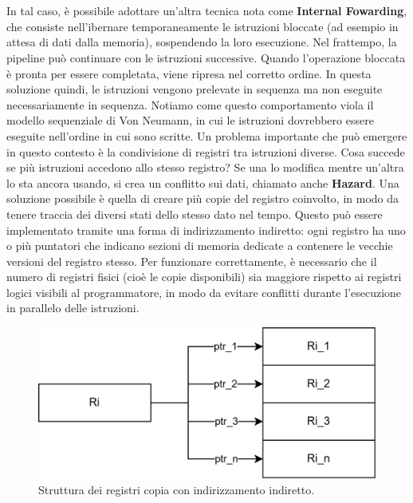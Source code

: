 \\
\\
In tal caso, è possibile adottare un'altra tecnica nota come \textbf{Internal Fowarding}, che consiste nell'ibernare temporaneamente le istruzioni bloccate (ad esempio in attesa di dati dalla memoria), sospendendo la loro esecuzione. Nel frattempo, la pipeline può continuare con le istruzioni successive. Quando l'operazione bloccata è pronta per essere completata, viene ripresa nel corretto ordine. In questa soluzione quindi, le istruzioni vengono prelevate in sequenza ma non eseguite necessariamente in sequenza. Notiamo come questo comportamento viola il modello sequenziale di Von Neumann, in cui le istruzioni dovrebbero essere eseguite nell'ordine in cui sono scritte. Un problema importante che può emergere in questo contesto è la condivisione di registri tra istruzioni diverse. Cosa succede se più istruzioni accedono allo stesso registro? Se una lo modifica mentre un'altra lo sta ancora usando, si crea un conflitto sui dati, chiamato anche \textbf{Hazard}.  Una soluzione possibile è quella di creare più copie del registro coinvolto, in modo da tenere traccia dei diversi stati dello stesso dato nel tempo. Questo può essere implementato tramite una forma di indirizzamento indiretto: ogni registro ha uno o più puntatori che indicano sezioni di memoria dedicate a contenere le vecchie versioni del registro stesso. Per funzionare correttamente, è necessario che il numero di registri fisici (cioè le copie disponibili) sia maggiore rispetto ai registri logici visibili al programmatore, in modo da evitare conflitti durante l'esecuzione in parallelo delle istruzioni.
\begin{figure}[!h]
    \centering
    \includegraphics[width=0.4\linewidth]{img/registri_copia.png}
    \caption{Struttura dei registri copia con indirizzamento indiretto.}
    \label{fig:enter-label}
\end{figure}

